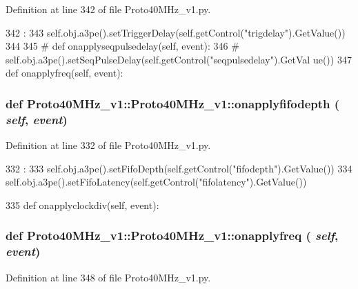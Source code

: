 Definition at line 342 of file Proto40MHz\_\-v1.py.


\begin{DoxyCode}
342                                  :
343         self.obj.a3pe().setTriggerDelay(self.getControl("trigdelay").GetValue())
344 
345 #    def onapplyseqpulsedelay(self, event):
346 #        self.obj.a3pe().setSeqPulseDelay(self.getControl("seqpulsedelay").GetVal
      ue())
347 
    def onapplyfreq(self, event):
\end{DoxyCode}
\hypertarget{classProto40MHz__v1_1_1Proto40MHz__v1_aeac7c328eb77aaf9d62186022a63767e}{
\subsubsection[{onapplyfifodepth}]{\setlength{\rightskip}{0pt plus 5cm}def Proto40MHz\_\-v1::Proto40MHz\_\-v1::onapplyfifodepth ( {\em self}, \/   {\em event})}}
\label{classProto40MHz__v1_1_1Proto40MHz__v1_aeac7c328eb77aaf9d62186022a63767e}


Definition at line 332 of file Proto40MHz\_\-v1.py.


\begin{DoxyCode}
332                                      :
333         self.obj.a3pe().setFifoDepth(self.getControl("fifodepth").GetValue())
334         self.obj.a3pe().setFifoLatency(self.getControl("fifolatency").GetValue())
      
335 
    def onapplyclockdiv(self, event):
\end{DoxyCode}
\hypertarget{classProto40MHz__v1_1_1Proto40MHz__v1_aa1097324dad1d2736699ad82f36c9b81}{
\subsubsection[{onapplyfreq}]{\setlength{\rightskip}{0pt plus 5cm}def Proto40MHz\_\-v1::Proto40MHz\_\-v1::onapplyfreq ( {\em self}, \/   {\em event})}}
\label{classProto40MHz__v1_1_1Proto40MHz__v1_aa1097324dad1d2736699ad82f36c9b81}


Definition at line 348 of file Proto40MHz\_\-v1.py.



